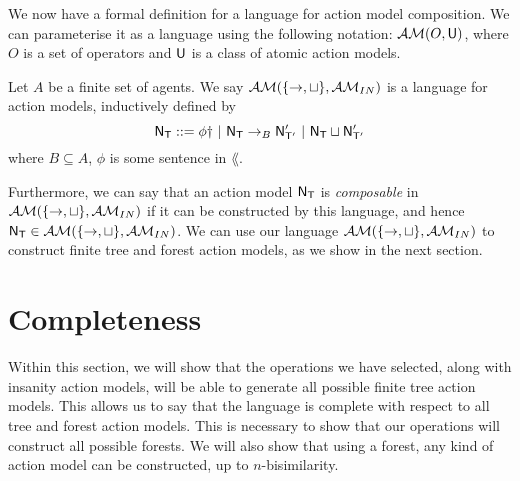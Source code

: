 We now have a formal definition for a language for action model composition.
We can parameterise it as a language using the following notation: $\mathcal{AM}(O, \mathrm{\mathsf{U}})$, where $O$ is a
set of operators and $\mathrm{\mathsf{U}}$ is a class of atomic action models.

\begin{defn} \label{axKLanguage}
	Let $A$ be a finite set of agents.
	We say $\mathcal{AM}(\{\to,\sqcup\}, \mathcal{AM}_{IN})$ is a language for action models, inductively defined by
\[
	\mathrm{\mathsf{N}}_\mathrm{\mathsf{T}} ::= \phi \dag \text{ } | \text{ } \mathrm{\mathsf{N}}_\mathrm{\mathsf{T}} \to_B \mathrm{\mathsf{N}}'_{\mathrm{\mathsf{T}}'} \text{ } | \text{ }
	\mathrm{\mathsf{N}}_\mathrm{\mathsf{T}} \sqcup \mathrm{\mathsf{N}}'_{\mathrm{\mathsf{T}}'}
\]
where $B \subseteq A$, $\phi$ is some sentence in $\lang$.
\end{defn}

Furthermore, we can say that an action model $\mathrm{\mathsf{N}}_\mathrm{\mathsf{T}}$ is {\em composable} in $\mathcal{AM}(\{\to,\sqcup\},
\mathcal{AM}_{IN})$ if it can be constructed by this language, and hence $\mathrm{\mathsf{N}}_\mathrm{\mathsf{T}} \in
\mathcal{AM}(\{\to,\sqcup\}, \mathcal{AM}_{IN})$.
We can use our language $\mathcal{AM}(\{\to,\sqcup\}, \mathcal{AM}_{IN})$ to  construct finite tree and
forest action models, as we show in the next section.

\section{Completeness} \label{subsec:multi:completeness}

Within this section, we will show that the operations we have selected, along
with insanity action
models, will be able to generate all possible finite tree action models.
This allows us to say that the language is complete with respect to all tree and forest action
models.
This is necessary to show that our operations will construct all possible forests.
We will also show that using a forest, any kind of action model can be constructed, up to $n$-bisimilarity.

